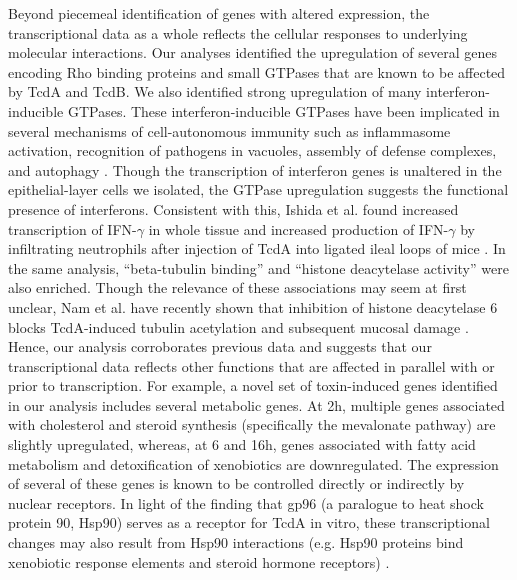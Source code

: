 Beyond piecemeal identification of genes with altered expression, the transcriptional data as a whole reflects the cellular responses to underlying molecular interactions. Our analyses identified the upregulation of several genes encoding Rho binding proteins and small GTPases that are known to be affected by TcdA and TcdB. We also identified strong upregulation of many interferon-inducible GTPases. These interferon-inducible GTPases have been implicated in several mechanisms of cell-autonomous immunity such as inflammasome activation, recognition of pathogens in vacuoles, assembly of defense complexes, and autophagy \cite{Kim:2012cu}. Though the transcription of interferon genes is unaltered in the epithelial-layer cells we isolated, the GTPase upregulation suggests the functional presence of interferons. Consistent with this, Ishida et al. found increased transcription of IFN-$\gamma$ in whole tissue and increased production of IFN-$\gamma$ by infiltrating neutrophils after injection of TcdA into ligated ileal loops of mice \cite{Ishida:2004ta}. In the same analysis, “beta-tubulin binding” and “histone deacytelase activity” were also enriched. Though the relevance of these associations may seem at first unclear, Nam et al. have recently shown that inhibition of histone deacytelase 6 blocks TcdA-induced tubulin acetylation and subsequent mucosal damage \cite{Nam:2010er}. Hence, our analysis corroborates previous data and suggests that our transcriptional data reflects other functions that are affected in parallel with or prior to transcription. For example, a novel set of toxin-induced genes identified in our analysis includes several metabolic genes. At 2h, multiple genes associated with cholesterol and steroid synthesis (specifically the mevalonate pathway) are slightly upregulated, whereas, at 6 and 16h, genes associated with fatty acid metabolism and detoxification of xenobiotics are downregulated. The expression of several of these genes is known to be controlled directly or indirectly by nuclear receptors. In light of the finding that gp96 (a paralogue to heat shock protein 90, Hsp90) serves as a receptor for TcdA in vitro, these transcriptional changes may also result from Hsp90 interactions (e.g. Hsp90 proteins bind xenobiotic response elements and steroid hormone receptors) \cite{Na:2008eu}.

